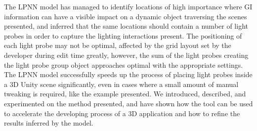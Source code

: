 The LPNN model has managed to identify locations of high importance where GI information can have a visible impact on a dynamic object traversing the scenes presented, and inferred that the same locations should contain a number of light probes in order to capture the lighting interactions present. The positioning of each light probe may not be optimal, affected by the grid layout set by the developer during edit time greatly, however, the sum of the light probes creating the light probe group object approaches optimal with the appropriate settings. The LPNN model successfully speeds up the process of placing light probes inside a 3D Unity scene significantly, even in cases where a small amount of manual tweaking is required, like the example presented. We introduced, described, and experimented on the method presented, and have shown how the tool can be used to accelerate the developing process of a 3D application and how to refine the results inferred by the model.